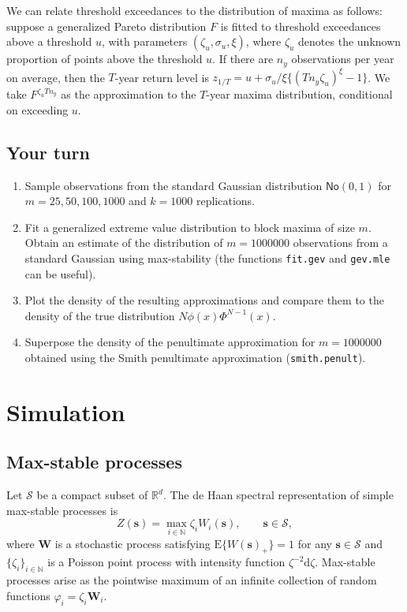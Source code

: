 \documentclass[]{book}
\providecommand{\tightlist}{%
  \setlength{\itemsep}{0pt}\setlength{\parskip}{0pt}}
\begin{document}
We can relate threshold exceedances to the distribution of maxima as follows: suppose a generalized Pareto distribution \(F\) is fitted to threshold exceedances above a threshold \(u\), with parameters \((\zeta_u, \sigma_u, \xi)\), where \(\zeta_u\) denotes the unknown proportion of points above the threshold \(u\). If there are \(n_y\) observations per year on average, then the \(T\)-year return level is \(z_{1/T}=u+\sigma_u/\xi\{(Tn_y\zeta_u)^\xi-1\}\). We take \(F^{\zeta_uTn_y}\) as the approximation to the \(T\)-year maxima distribution, conditional on exceeding \(u\).

\hypertarget{your-turn-2}{%
\section{Your turn}\label{your-turn-2}}

\begin{enumerate}
\def\labelenumi{\arabic{enumi}.}
\tightlist
\item
  Sample observations from the standard Gaussian distribution \(\mathsf{No}(0,1)\) for \(m = 25, 50, 100, 1000\) and \(k=1000\) replications.
\item
  Fit a generalized extreme value distribution to block maxima of size \(m\). Obtain an estimate of the distribution of \(m = 1000000\) observations from a standard Gaussian using max-stability (the functions \texttt{fit.gev} and \texttt{gev.mle} can be useful).
\item
  Plot the density of the resulting approximations and compare them to the density of the true distribution \(N\phi(x)\Phi^{N-1}(x)\).
\item
  Superpose the density of the penultimate approximation for \(m = 1000000\) obtained using the Smith penultimate approximation (\texttt{smith.penult}).
\end{enumerate}

\hypertarget{simulation}{%
\chapter{Simulation}\label{simulation}}

\hypertarget{max-stable-processes}{%
\section{Max-stable processes}\label{max-stable-processes}}

Let \(\mathcal{S}\) be a compact subset of \(\mathbb{R}^d\).
The de Haan spectral representation \citep{deHaan:1984} of simple max-stable processes is \citep{Schlather:2003}
\[Z(\boldsymbol{s}) = \max_{i \in \mathbb{N}} \zeta_i W_i(\boldsymbol{s}), \qquad \boldsymbol{s} \in \mathcal{S},\]
where \(\boldsymbol{W}\) is a stochastic process satisfying \(\mathrm{E}\{W(\boldsymbol{s})_{+}\}=1\) for any \(\boldsymbol{s} \in \mathcal{S}\) and \(\{\zeta_i\}_{i \in \mathbb{N}}\) is a Poisson point process with intensity function \(\zeta^{-2} \mathrm{d} \zeta\). Max-stable processes arise as the pointwise maximum of an infinite collection of random functions \(\varphi_i = \zeta_i \boldsymbol{W}_i\).
\end{document}
